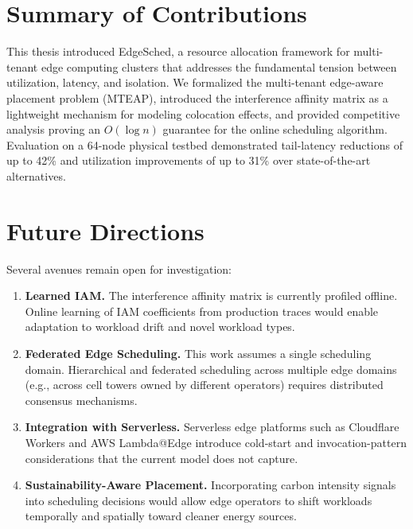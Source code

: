 \documentclass[12pt,letterpaper,twoside]{report}
\begin{document}
\section{Summary of Contributions}

This thesis introduced EdgeSched, a resource allocation framework for multi-tenant edge computing clusters that addresses the fundamental tension between utilization, latency, and isolation. We formalized the multi-tenant edge-aware placement problem (MTEAP), introduced the interference affinity matrix as a lightweight mechanism for modeling colocation effects, and provided competitive analysis proving an \(O(\log n)\) guarantee for the online scheduling algorithm. Evaluation on a 64-node physical testbed demonstrated tail-latency reductions of up to 42\% and utilization improvements of up to 31\% over state-of-the-art alternatives.

\section{Future Directions}

Several avenues remain open for investigation:

\begin{enumerate}[leftmargin=*,itemsep=6pt]
    \item \textbf{Learned IAM.} The interference affinity matrix is currently profiled offline. Online learning of IAM coefficients from production traces would enable adaptation to workload drift and novel workload types.

    \item \textbf{Federated Edge Scheduling.} This work assumes a single scheduling domain. Hierarchical and federated scheduling across multiple edge domains (e.g., across cell towers owned by different operators) requires distributed consensus mechanisms.

    \item \textbf{Integration with Serverless.} Serverless edge platforms such as Cloudflare Workers and AWS Lambda@Edge introduce cold-start and invocation-pattern considerations that the current model does not capture.

    \item \textbf{Sustainability-Aware Placement.} Incorporating carbon intensity signals into scheduling decisions would allow edge operators to shift workloads temporally and spatially toward cleaner energy sources.
\end{enumerate}
\end{document}

